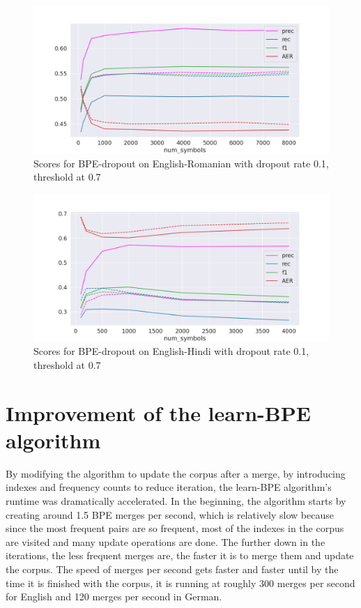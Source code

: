 \begin{figure}[!ht]
    \centering
    \includegraphics[width=13cm]{../reports/scores_dropout_bpe/space/0.1/eng_ron_0.7_thres_fastalign.png}
    \caption{Scores for BPE-dropout on English-Romanian with dropout rate 0.1, threshold at 0.7}
\end{figure}

\begin{figure}[!ht]
    \centering
    \includegraphics[width=13cm]{../reports/scores_dropout_bpe/space/0.1/eng_hin_0.7_thres_fastalign.png}
    \caption{Scores for BPE-dropout on English-Hindi with dropout rate 0.1, threshold at 0.7}
\end{figure}

\section{Improvement of the learn-BPE algorithm}

By modifying the algorithm to update the corpus after a merge, by introducing indexes and frequency counts to reduce iteration, the learn-BPE algorithm's runtime was dramatically accelerated. In the beginning, the algorithm starts by creating around 1.5 BPE merges per second, which is relatively slow because since the most frequent pairs are so frequent, most of the indexes in the corpus are visited and many update operations are done. The further down in the iterations, the less frequent merges are, the faster it is to merge them and update the corpus. The speed of merges per second gets faster and faster until by the time it is finished with the corpus, it is running at roughly 300 merges per second for English and 120 merges per second in German.

